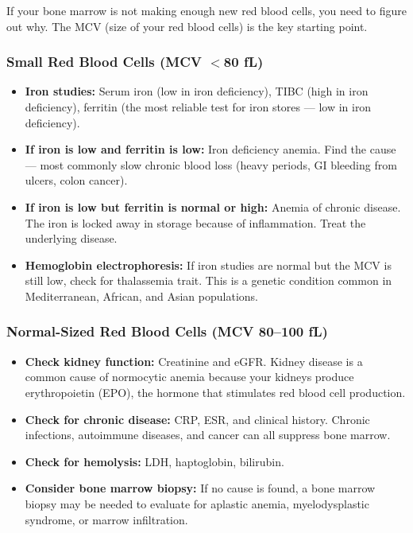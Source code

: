 If your bone marrow is not making enough new red blood cells, you need to figure out why. The MCV (size of your red blood cells) is the key starting point.

\subsubsection{Small Red Blood Cells (MCV $<$80 fL)}

\begin{itemize}
    \item \textbf{Iron studies:} Serum iron (low in iron deficiency), TIBC (high in iron deficiency), ferritin (the most reliable test for iron stores --- low in iron deficiency).
    \item \textbf{If iron is low and ferritin is low:} Iron deficiency anemia. Find the cause --- most commonly slow chronic blood loss (heavy periods, GI bleeding from ulcers, colon cancer).
    \item \textbf{If iron is low but ferritin is normal or high:} Anemia of chronic disease. The iron is locked away in storage because of inflammation. Treat the underlying disease.
    \item \textbf{Hemoglobin electrophoresis:} If iron studies are normal but the MCV is still low, check for thalassemia trait. This is a genetic condition common in Mediterranean, African, and Asian populations.
\end{itemize}

\subsubsection{Normal-Sized Red Blood Cells (MCV 80--100 fL)}

\begin{itemize}
    \item \textbf{Check kidney function:} Creatinine and eGFR. Kidney disease is a common cause of normocytic anemia because your kidneys produce erythropoietin (EPO), the hormone that stimulates red blood cell production.
    \item \textbf{Check for chronic disease:} CRP, ESR, and clinical history. Chronic infections, autoimmune diseases, and cancer can all suppress bone marrow.
    \item \textbf{Check for hemolysis:} LDH, haptoglobin, bilirubin.
    \item \textbf{Consider bone marrow biopsy:} If no cause is found, a bone marrow biopsy may be needed to evaluate for aplastic anemia, myelodysplastic syndrome, or marrow infiltration.
\end{itemize}

